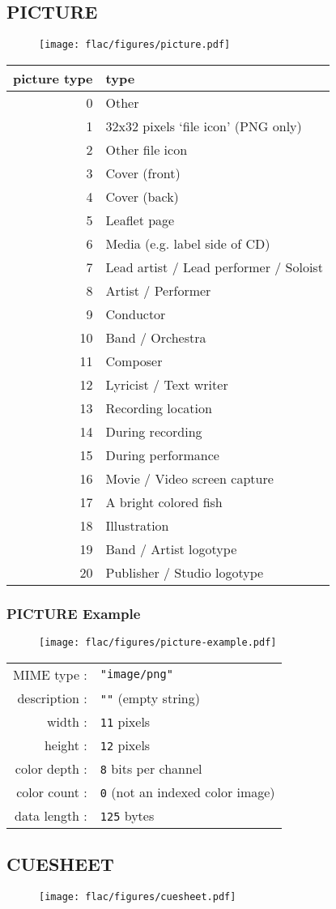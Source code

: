 \subsection{PICTURE}
\begin{figure}[h]
\texttt{[image: flac/figures/picture.pdf]}
\end{figure}
{
\begin{tabular}{r|l}
picture type & type \\
\hline
0 & Other \\
1 & 32x32 pixels `file icon' (PNG only) \\
2 & Other file icon \\
3 & Cover (front) \\
4 & Cover (back) \\
5 & Leaflet page \\
6 & Media (e.g. label side of CD) \\
7 & Lead artist / Lead performer / Soloist \\
8 & Artist / Performer \\
9 & Conductor \\
10 & Band / Orchestra \\
11 & Composer \\
12 & Lyricist / Text writer \\
13 & Recording location \\
14 & During recording \\
15 & During performance \\
16 & Movie / Video screen capture \\
17 & A bright colored fish \\
18 & Illustration \\
19 & Band / Artist logotype \\
20 & Publisher / Studio logotype \\
\end{tabular}
}
\clearpage

\subsubsection{PICTURE Example}
\begin{figure}[h]
  \texttt{[image: flac/figures/picture-example.pdf]}
\end{figure}
\begin{table}[h]
{
  \begin{tabular}{rl}
    MIME type : & \texttt{"image/png"} \\
    description : & \texttt{""} (empty string) \\
    width : & \texttt{11} pixels \\
    height : & \texttt{12} pixels \\
    color depth : & \texttt{8} bits per channel \\
    color count : & \texttt{0} (not an indexed color image) \\
    data length : & \texttt{125} bytes \\
  \end{tabular}
}
\end{table}

\clearpage

\subsection{CUESHEET}
\begin{figure}[h]
  \texttt{[image: flac/figures/cuesheet.pdf]}
\end{figure}
